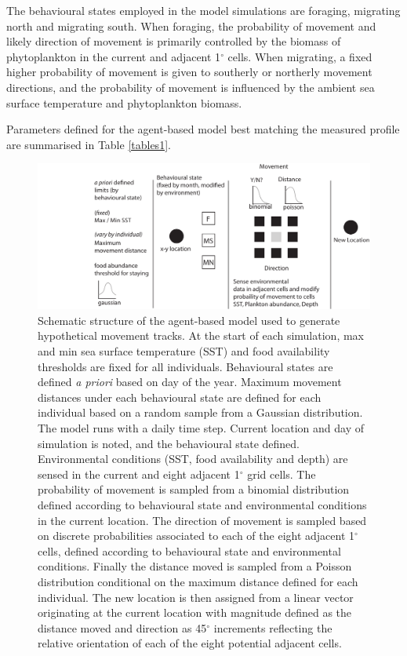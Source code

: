 \documentclass[a4paper,12pt]{article}
\begin{document}
The behavioural states employed in the model simulations are foraging, migrating north and migrating south. 
When foraging, the probability of movement and likely direction of movement is primarily controlled by the biomass of phytoplankton in the current and adjacent 1$^{\circ}$ cells. 
When migrating, a fixed higher probability of movement is given to southerly or northerly movement directions, and the probability of movement is influenced by the ambient sea surface temperature and phytoplankton biomass.
 
Parameters defined for the agent-based model best matching the measured profile are summarised in Table \ref{tables1}.

\newpage

\begin{landscape}

  \vspace{-1cm}
\begin{figure}[!htbp]
  \centering
  \includegraphics[trim = {3cm 0 0 0}, clip]{figures/flow-diagram-model.pdf}
  \linespread{0.8}
  \caption{
  Schematic structure of the agent-based model used to generate hypothetical movement tracks. 
  At the start of each simulation, max and min sea surface temperature (SST) and food availability thresholds are fixed for all individuals. Behavioural states are defined \textit{a priori} based on day of the year. Maximum movement distances under each behavioural state are defined for each individual based on a random sample from a Gaussian distribution. The model runs with a daily time step. Current location and day of simulation is noted, and the behavioural state defined. Environmental conditions (SST, food availability and depth) are sensed in the current and eight adjacent 1$^{\circ}$ grid cells. The probability of movement is sampled from a binomial distribution defined according to behavioural state and environmental conditions in the current location. The direction of movement is sampled based on discrete probabilities associated to each of the eight adjacent 1$^{\circ}$ cells, defined according to behavioural state and environmental conditions. Finally the distance moved is sampled from a Poisson distribution conditional on the maximum distance defined for each individual. The new location is then assigned from a linear vector originating at the current location with magnitude defined as the distance moved and direction as 45$^{\circ}$ increments reflecting the relative orientation of each of the eight potential adjacent cells.}
  \label{figs5}
\end{figure}


\end{landscape}
\end{document}
